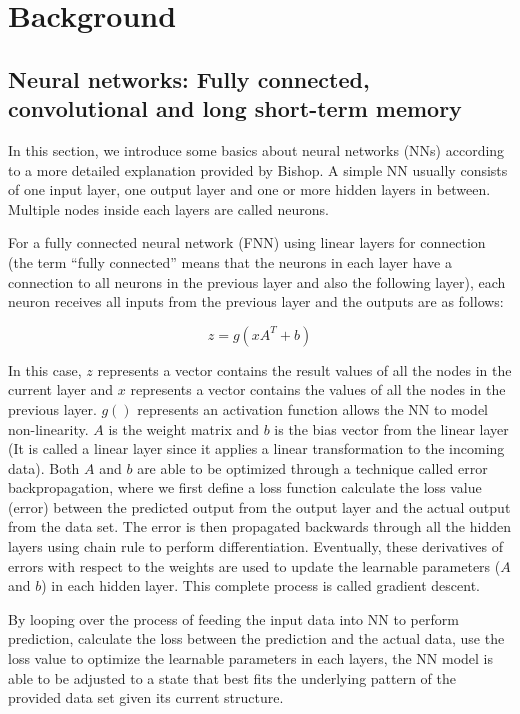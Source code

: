 \chapter{Background}\label{chap:background}


\section{Neural networks: Fully connected, convolutional and long short-term memory}

In this section, we introduce some basics about neural networks (NNs) according to a more detailed explanation provided by Bishop. \citep{10.1117_1.2819119} A simple NN usually consists of one input layer, 
one output layer and one or more hidden layers in between. Multiple nodes inside each layers are called neurons. 

For a fully connected neural network (FNN) using linear layers for connection (the term “fully connected” means that the neurons in each layer have a connection to all neurons in the previous layer and also the following layer), each neuron receives all inputs from the previous layer and the outputs are as follows:

\begin{equation}
z = g(xA^{T} + b)
\end{equation}

In this case, $z$ represents a vector contains the result values of all the nodes in the current layer and $x$ represents a vector contains the values of all the nodes in the previous layer. $g()$ represents an activation function allows the NN to model non-linearity. $A$ is the weight matrix and $b$ is the bias vector from the linear layer (It is called a linear layer since it applies a linear transformation to the incoming data). Both $A$ and $b$ are able to be optimized through a technique called error backpropagation, where we first define a loss function calculate the loss value (error) between the predicted output from the output layer and the actual output from the data set. The error is then propagated backwards through all the hidden layers using chain rule to perform differentiation. Eventually, these derivatives of errors with respect to the weights are used to update the learnable parameters ($A$ and $b$) in each hidden layer. This complete process is called gradient descent. 

By looping over the process of feeding the input data into NN to perform prediction, calculate the loss between the prediction and the actual data, use the loss value to optimize the learnable parameters in each layers, the NN model is able to be adjusted to a state that best fits the underlying pattern of the provided data set given its current structure.

